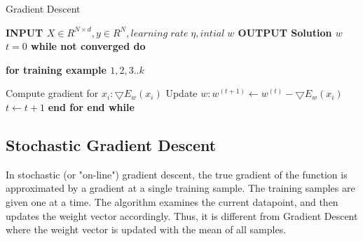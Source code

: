 \documentclass{sigplanconf}
\newlength\myindent
\newcommand\bindent{%
  \begingroup
  \setlength{\itemindent}{\myindent}
  \addtolength{\algorithmicindent}{\myindent}
}
\newcommand\eindent{\endgroup}
\newlength\mysecindent
\newcommand\quadindent{%
  \begingroup
  \setlength{\itemindent}{\mysecindent}
  \addtolength{\algorithmicindent}{\mysecindent}
}
\newcommand\quadeindent{\endgroup}
\begin{document}
\begin{algorithm}
\caption{	Gradient Descent}
\begin{algorithmic} 

\STATE \bf{INPUT} \begin{math} X \in {R}^{N \times  d}, y \in R^N, learning\;  rate\;  \eta, intial\; w \end{math} 
\STATE \bf{OUTPUT} \textnormal{Solution} \begin{math}  w \end{math} 
	\STATE \textnormal{\begin{math} t = 0\end{math} }
	\STATE \bf{while} \textnormal{not converged} \bf{do}
    	\bindent
		 \STATE \bf{for} \textnormal{\indent training example \begin{math}1,2,3..k\end{math}}
		\quadindent
			 \STATE \textnormal{\indent Compute gradient for \begin{math}x_i: \bigtriangledown{E_w(x_i)}\end{math}}
			 \STATE \textnormal{\indent Update \begin{math}w: w^{(t+1)} \gets w^{(t)} - \bigtriangledown{E_w(x_i)}\end{math}}
			 \STATE \textnormal{\indent \begin{math}t \gets t + 1\end{math}}
		\quadeindent
	 \STATE \bf{end for}
	 \eindent
\STATE \bf{end while}

\end{algorithmic}
\end{algorithm}

\subsection{Stochastic Gradient Descent}
In stochastic (or "on-line") gradient descent, the true gradient of the function is approximated by a gradient at a
single training sample. The training samples are given one at a time. The algorithm examines the
current datapoint, and then updates the weight vector accordingly. Thus, it is different from Gradient Descent where the weight
vector is updated with the mean of all samples.
\end{document}
